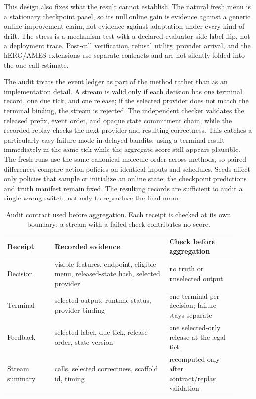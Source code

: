 \documentclass[sigconf,anonymous]{aamas}
\begin{document}
This design also fixes what the result cannot establish. The natural fresh menu is a stationary checkpoint panel, so its null online gain is evidence against a generic online improvement claim, not evidence against adaptation under every kind of drift. The stress is a mechanism test with a declared evaluator-side label flip, not a deployment trace. Post-call verification, refusal utility, provider arrival, and the hERG/AMES extensions use separate contracts and are not silently folded into the one-call estimate.

The audit treats the event ledger as part of the method rather than as an implementation detail. A stream is valid only if each decision has one terminal record, one due tick, and one release; if the selected provider does not match the terminal binding, the stream is rejected. The independent checker validates the released prefix, event order, and opaque state commitment chain, while the recorded replay checks the next provider and resulting correctness. This catches a particularly easy failure mode in delayed bandits: using a terminal result immediately in the same tick while the aggregate score still appears plausible. The fresh runs use the same canonical molecule order across methods, so paired differences compare action policies on identical inputs and schedules. Seeds affect only policies that sample or initialize an online state; the checkpoint predictions and truth manifest remain fixed. The resulting records are sufficient to audit a single wrong switch, not only to reproduce the final mean.

\begin{table}[t]
\caption{Audit contract used before aggregation. Each receipt is checked at its own boundary; a stream with a failed check contributes no score.}
\label{tab:audit-contract}
\small
{\setlength{\tabcolsep}{3pt}
\begin{tabular}{@{}P{0.19\linewidth}P{0.46\linewidth}P{0.27\linewidth}@{}}
\toprule
Receipt & Recorded evidence & Check before aggregation \\
\midrule
Decision & visible features, endpoint, eligible menu, released-state hash, selected provider & no truth or unselected output \\
Terminal & selected output, runtime status, provider binding & one terminal per decision; failure stays separate \\
Feedback & selected label, due tick, release order, state version & one selected-only release at the legal tick \\
Stream summary & calls, selected correctness, scaffold id, timing & recomputed only after contract/replay validation \\
\bottomrule
\end{tabular}}
\end{table}
\end{document}
